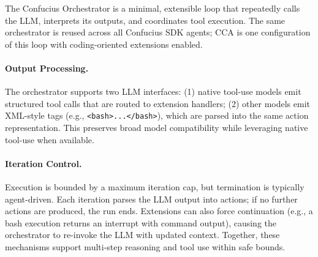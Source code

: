 

The Confucius Orchestrator is a minimal, extensible loop that repeatedly calls the LLM, interprets its outputs, and coordinates tool execution. The same orchestrator is reused across all Confucius SDK agents; CCA is one configuration of this loop with coding-oriented extensions enabled.

\paragraph{Output Processing.}
The orchestrator supports two LLM interfaces: (1) native tool-use models emit structured tool calls that are routed to extension handlers; (2) other models emit XML-style tags (e.g., \texttt{<bash>...</bash>}), which are parsed into the same action representation. This preserves broad model compatibility while leveraging native tool-use when available.

\paragraph{Iteration Control.}
Execution is bounded by a maximum iteration cap, but termination is typically agent-driven. Each iteration parses the LLM output into actions; if no further actions are produced, the run ends. Extensions can also force continuation (e.g., a bash execution returns an interrupt with command output), causing the orchestrator to re-invoke the LLM with updated context. Together, these mechanisms support multi-step reasoning and tool use within safe bounds.



